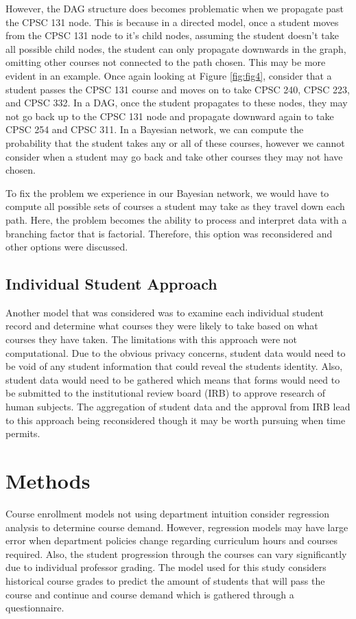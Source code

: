\documentclass[12pt]{article}
\begin{document}
However, the DAG structure does 
becomes problematic when we propagate past the CPSC 131 node. This is because in a directed 
model, once a student moves from the CPSC 131 node to it's child nodes, assuming the student doesn't 
take all possible child nodes, the student can only propagate downwards in the graph, omitting other courses
not connected to the path chosen. This may be more evident in an example. Once again looking at Figure 
\ref{fig:fig4}, consider that a student passes the CPSC 131 course and moves on to take CPSC 240, 
CPSC 223, and CPSC 332. In a DAG, once the student propagates to these nodes, they may not go 
back up to the CPSC 131 node and propagate downward again to take CPSC 254 and CPSC 311. In 
a Bayesian network, we can compute the probability that the student takes any or all of these courses, 
however we cannot consider when a student may go back and take other courses they may not have chosen.

To fix the problem we experience in our Bayesian network, we would have to compute all possible sets of 
courses a student may take as they travel down each path. Here, the problem becomes the ability to process
and interpret data with a branching factor that is factorial. Therefore, this option was reconsidered and 
other options were discussed.

\subsection*{Individual Student Approach}
Another model that was considered was to examine each individual student record and determine what courses
they were likely to take based on what courses they have taken. The limitations with this approach were not 
computational. Due to the obvious privacy concerns, student data would need to be void of any student information
that could reveal the students identity. Also, student data would need to be gathered which means that 
forms would need to be submitted to the institutional review board (IRB) to approve research of human subjects. 
The aggregation of student data and the approval from IRB lead to this approach being reconsidered though
it may be worth pursuing when time permits. 


\section*{Methods}
Course enrollment models not using department intuition consider regression analysis to determine course 
demand. However, regression models may have large error when department policies change regarding 
curriculum hours and courses required. Also, the student progression through the courses can vary 
significantly due to individual professor grading. The model used for this study considers historical course 
grades to predict the amount of students that will pass the course and continue and course demand which
is gathered through a questionnaire.
\end{document}
